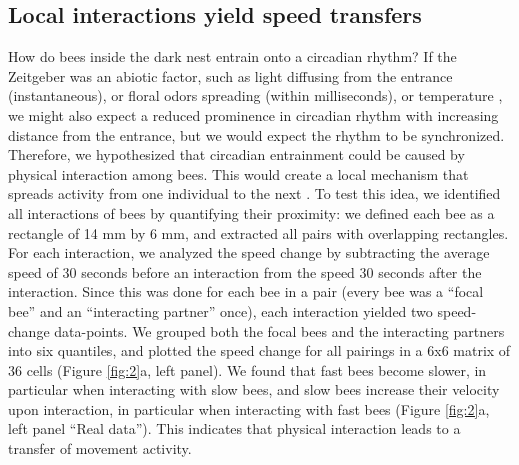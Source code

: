 \documentclass{article}
\begin{document}
\subsection{Local interactions yield speed transfers}
How do bees inside the dark nest entrain onto a circadian rhythm? If the Zeitgeber was an abiotic factor, such as light diffusing from the entrance (instantaneous), or floral odors spreading (within milliseconds), or temperature \cite{jhawar_how_2023}, we might also expect a reduced prominence in circadian rhythm with increasing distance from the entrance, but we would expect the rhythm to be synchronized. Therefore, we hypothesized that circadian entrainment could be caused by physical interaction among bees. This would create a local mechanism that spreads activity from one individual to the next \cite{vicsek_collective_2012}. To test this idea, we identified all interactions of bees by quantifying their proximity: we defined each bee as a rectangle of 14 mm by 6 mm, and extracted all pairs with overlapping rectangles. For each interaction, we analyzed the speed change by subtracting the average speed of 30 seconds before an interaction from the speed 30 seconds after the interaction. Since this was done for each bee in a pair (every bee was a “focal bee” and an “interacting partner” once), each interaction yielded two speed-change data-points. We grouped both the focal bees and the interacting partners into six quantiles, and plotted the speed change for all pairings in a 6x6 matrix of 36 cells (Figure \ref{fig:2}a, left panel). We found that fast bees become slower, in particular when interacting with slow bees, and slow bees increase their velocity upon interaction, in particular when interacting with fast bees (Figure \ref{fig:2}a, left panel “Real data”). This indicates that physical interaction leads to a transfer of movement activity.   
\end{document}
